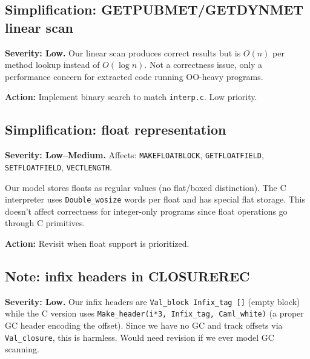 \documentclass[11pt,a4paper]{article}
\newif\ifinternalaudit
\begin{document}
\subsection{Simplification: GETPUBMET/GETDYNMET linear scan}
\label{action:oo}

\textbf{Severity: Low.}
Our linear scan produces correct results but is $O(n)$ per method lookup
instead of $O(\log n)$.  Not a correctness issue, only a performance concern
for extracted code running OO-heavy programs.

\textbf{Action:} Implement binary search to match \texttt{interp.c}.
Low priority.

\subsection{Simplification: float representation}
\label{action:float}

\textbf{Severity: Low--Medium.}
Affects: \texttt{MAKEFLOATBLOCK}, \texttt{GETFLOATFIELD}, \texttt{SETFLOATFIELD},
\texttt{VECTLENGTH}.

Our model stores floats as regular values (no flat/boxed distinction).
The C interpreter uses \texttt{Double\_wosize} words per float and has
special flat storage.  This doesn't affect correctness for integer-only
programs since float operations go through C primitives.

\textbf{Action:} Revisit when float support is prioritized.

\subsection{Note: infix headers in CLOSUREREC}
\label{action:infix}

\textbf{Severity: Low.}
Our infix headers are \texttt{Val\_block Infix\_tag []} (empty block)
while the C version uses \texttt{Make\_header(i*3, Infix\_tag, Caml\_white)}
(a proper GC header encoding the offset).  Since we have no GC and track
offsets via \texttt{Val\_closure}, this is harmless.  Would need revision
if we ever model GC scanning.

\fi%
\end{document}
